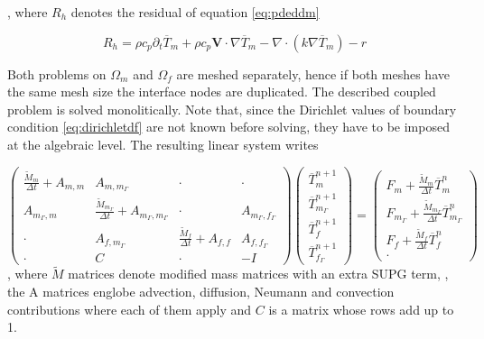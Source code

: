 , where $R_h$ denotes the residual of equation \ref{eq:pdeddm}

$$
R_h = \rho c_p \partial_t \overline{T}_m + \rho c_p \mathbf{V} \cdot \nabla \overline{T}_m - \nabla \cdot ( k \nabla \overline{T}_m) - r
$$

Both problems on $\Omega_m$ and $\Omega_f$
are meshed separately, hence if both meshes
have the same mesh size the interface nodes are duplicated.
The described coupled problem is solved monolitically.
Note that, since the Dirichlet values of boundary condition
\ref{eq:dirichletdf} are not known before solving,
they have to be imposed at the algebraic level.
The resulting linear system writes

\begin{equation}\label{eq:algebraic_coupled}
  \begin{pmatrix}
    \frac{\tilde{M}_m}{\Delta t} + A_{m, m} & A_{m, m_\Gamma} & \cdot & \cdot \\[3mm]
    A_{m_\Gamma, m} & \frac{\tilde{M}_{m_\Gamma}}{\Delta t} + A_{m_\Gamma, m_\Gamma} & \cdot & A_{m_\Gamma, f_\Gamma}  \\[3mm]
    \cdot & A_{f, m_\Gamma} & \frac{\tilde{M}_{f}}{\Delta t}  + A_{f, f} & A_{f, f_\Gamma}  \\[3mm]
    \cdot & C & \cdot & -I
  \end{pmatrix}
  \begin{pmatrix}
    \overline{T}_m^{n+1}          \\[3mm]
    \overline{T}_{m_\Gamma}^{n+1} \\[3mm]
    \overline{T}_f^{n+1}          \\[3mm]
    \overline{T}_{f_\Gamma}^{n+1}
  \end{pmatrix}
  =
  \begin{pmatrix}
    F_m          + \frac{\tilde{M}_m}{\Delta t} \overline{T}_m^{n}\\[3mm]
    F_{m_\Gamma} + \frac{\tilde{M}_{m_\Gamma}}{\Delta t} \overline{T}_{m_\Gamma}^{n}\\[3mm]
    F_{f}        + \frac{\tilde{M}_{f}}{\Delta t} \overline{T}_{f}^{n}\\[3mm]
    \cdot
  \end{pmatrix}
\end{equation}
, where $\tilde{M}$ matrices denote modified mass matrices with an extra SUPG term,
, the A matrices englobe advection, diffusion, Neumann and convection contributions
where each of them apply and $C$ is a matrix whose rows add up to 1.\par

